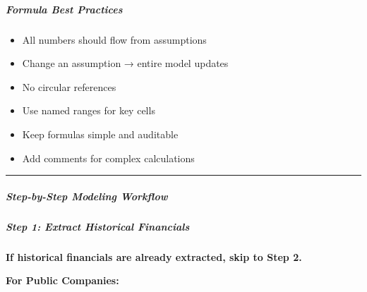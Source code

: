 \documentclass[11pt]{article}
\begin{document}
\subparagraph{Formula Best Practices}\mbox{}\par
\begin{itemize}[leftmargin=*,itemsep=2pt,topsep=2pt]
\item {} All numbers should flow from assumptions
\item {} Change an assumption → entire model updates
\item {} No circular references
\item {} Use named ranges for key cells
\item {} Keep formulas simple and auditable
\item {} Add comments for complex calculations
\end{itemize}

\vspace{0.5em}\hrule\vspace{0.5em}

\subparagraph{Step-by-Step Modeling Workflow}\mbox{}\par

\subparagraph{Step 1: Extract Historical Financials}\mbox{}\par

\textbf{If historical financials are already extracted, skip to Step 2.}


\textbf{For Public Companies:}
\end{document}
